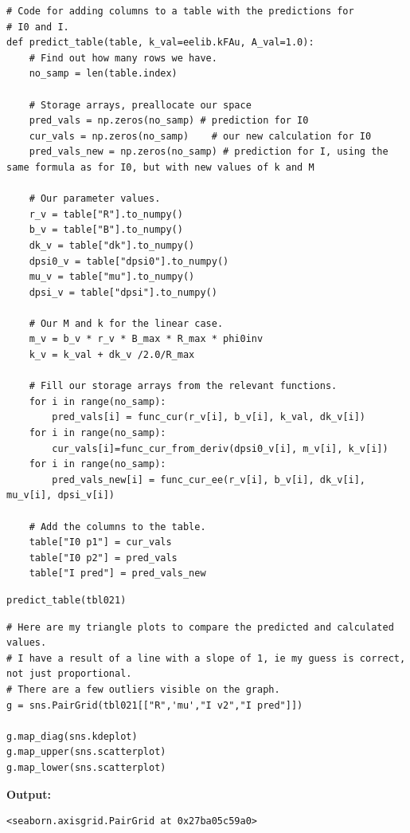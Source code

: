 \documentclass{article}
\begin{document}
\begin{lstlisting}
# Code for adding columns to a table with the predictions for
# I0 and I. 
def predict_table(table, k_val=eelib.kFAu, A_val=1.0):
    # Find out how many rows we have.
    no_samp = len(table.index)

    # Storage arrays, preallocate our space
    pred_vals = np.zeros(no_samp) # prediction for I0 
    cur_vals = np.zeros(no_samp)    # our new calculation for I0
    pred_vals_new = np.zeros(no_samp) # prediction for I, using the same formula as for I0, but with new values of k and M

    # Our parameter values.
    r_v = table["R"].to_numpy()
    b_v = table["B"].to_numpy()
    dk_v = table["dk"].to_numpy()
    dpsi0_v = table["dpsi0"].to_numpy()
    mu_v = table["mu"].to_numpy()
    dpsi_v = table["dpsi"].to_numpy()

    # Our M and k for the linear case.
    m_v = b_v * r_v * B_max * R_max * phi0inv
    k_v = k_val + dk_v /2.0/R_max

    # Fill our storage arrays from the relevant functions.
    for i in range(no_samp):
        pred_vals[i] = func_cur(r_v[i], b_v[i], k_val, dk_v[i])
    for i in range(no_samp):
        cur_vals[i]=func_cur_from_deriv(dpsi0_v[i], m_v[i], k_v[i])
    for i in range(no_samp):
        pred_vals_new[i] = func_cur_ee(r_v[i], b_v[i], dk_v[i], mu_v[i], dpsi_v[i])

    # Add the columns to the table.
    table["I0 p1"] = cur_vals
    table["I0 p2"] = pred_vals
    table["I pred"] = pred_vals_new\end{lstlisting}

\begin{lstlisting}
predict_table(tbl021)\end{lstlisting}

\begin{lstlisting}
# Here are my triangle plots to compare the predicted and calculated values.
# I have a result of a line with a slope of 1, ie my guess is correct, not just proportional.
# There are a few outliers visible on the graph.
g = sns.PairGrid(tbl021[["R",'mu',"I v2","I pred"]])

g.map_diag(sns.kdeplot)
g.map_upper(sns.scatterplot)
g.map_lower(sns.scatterplot)\end{lstlisting}

\textbf{Output:}\begin{verbatim}
<seaborn.axisgrid.PairGrid at 0x27ba05c59a0>
\end{verbatim}
\end{document}
